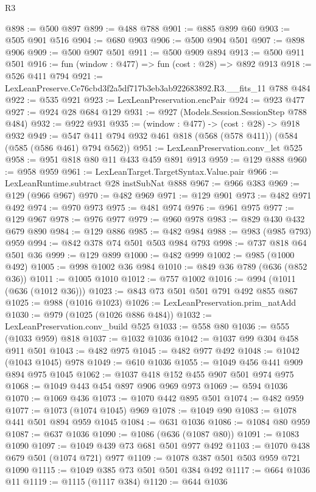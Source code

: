 \begin{lexlean}{R3}
\begin{coremodule}
@898 := @500 @897
@899 := @488 @788
@901 := @885 @899 @60
@903 := @505 @901 @516
@904 := @680 @903
@906 := @500 @904 @501
@907 := @898 @906
@909 := @500 @907 @501
@911 := @500 @909 @894
@913 := @500 @911 @501
@916 := fun (window : @477) => fun (cost : @28) => @892 @913
@918 := @526 @411 @794
@921 := LexLeanPreserve.Ce76cbd3f2a5df717b3eb3ab922683892.R3.__fits_11 @788 @484
@922 := @535 @921
@923 := LexLeanPreservation.encPair
@924 := @923 @477
@927 := @924 @28 @684 @129
@931 := @927 (Models.Session.SessionStep @788 @484)
@932 := @922 @931
@935 := (window : @477) -> (cost : @28) -> @918 @932
@949 := @547 @411 @794 @932 @461 @818 (@568 (@578 @411)) (@584 (@585 (@586 @461) @794 @562))
@951 := LexLeanPreservation.conv_let @525
@958 := @951 @818 @80 @11 @433 @459 @891 @913
@959 := @129 @888
@960 := @958 @959
@961 := LexLeanTarget.TargetSyntax.Value.pair
@966 := LexLeanRuntime.subtract @28 instSubNat @888
@967 := @966 @383
@969 := @129 (@966 @967)
@970 := @482 @969
@971 := @129 @901
@973 := @482 @971 @492
@974 := @970 @973
@975 := @481 @974
@976 := @961 @975
@977 := @129 @967
@978 := @976 @977
@979 := @960 @978
@983 := @829 @430 @432 @679 @890
@984 := @129 @886
@985 := @482 @984
@988 := @983 (@985 @793) @959
@994 := @842 @378 @74 @501 @503 @984 @793
@998 := @737 @818 @64 @501 @36
@999 := @129 @899
@1000 := @482 @999
@1002 := @985 (@1000 @492)
@1005 := @998 @1002 @36 @984
@1010 := @849 @36 @789 (@636 (@852 @36))
@1011 := @1005 @1010
@1012 := @757 @1002
@1016 := @994 (@1011 (@636 (@1012 @36)))
@1023 := @843 @73 @501 @501 @791 @492 @855 @867
@1025 := @988 (@1016 @1023)
@1026 := LexLeanPreservation.prim_natAdd
@1030 := @979 (@1025 (@1026 @886 @484))
@1032 := LexLeanPreservation.conv_build @525
@1033 := @558 @80
@1036 := @555 (@1033 @959) @818
@1037 := @1032 @1036
@1042 := @1037 @99 @304 @458 @911 @501
@1043 := @482 @975
@1045 := @482 @977 @492
@1048 := @1042 (@1043 @1045) @978
@1049 := @610 @1036
@1055 := @1049 @456 @441 @909 @894 @975 @1045
@1062 := @1037 @418 @152 @455 @907 @501 @974 @975
@1068 := @1049 @443 @454 @897 @906 @969 @973
@1069 := @594 @1036
@1070 := @1069 @436
@1073 := @1070 @442 @895 @501
@1074 := @482 @959
@1077 := @1073 (@1074 @1045) @969
@1078 := @1049 @90
@1083 := @1078 @441 @501 @894 @959 @1045
@1084 := @631 @1036
@1086 := @1084 @80 @959
@1087 := @637 @1036
@1090 := @1086 (@636 (@1087 @80))
@1091 := @1083 @1090
@1097 := @1049 @439 @73 @681 @501 @977 @492
@1103 := @1070 @438 @679 @501 (@1074 @721) @977
@1109 := @1078 @387 @501 @503 @959 @721 @1090
@1115 := @1049 @385 @73 @501 @501 @384 @492
@1117 := @664 @1036 @11
@1119 := @1115 (@1117 @384)
@1120 := @644 @1036

\end{coremodule}
\end{lexlean}
